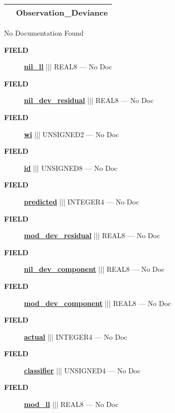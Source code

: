 {\renewcommand{\arraystretch}{1.5}
\begin{tabularx}{\textwidth}{|>{\raggedright\arraybackslash}l|X|}
\hline
\hspace{0pt}\mytexttt{\color{red} } & \textbf{Observation\_Deviance} \\
\hline
\end{tabularx}
}

\par





No Documentation Found







\par
\begin{description}
\item [\colorbox{tagtype}{\color{white} \textbf{\textsf{FIELD}}}] \textbf{\underline{nil\_ll}} ||| REAL8 --- No Doc
\item [\colorbox{tagtype}{\color{white} \textbf{\textsf{FIELD}}}] \textbf{\underline{nil\_dev\_residual}} ||| REAL8 --- No Doc
\item [\colorbox{tagtype}{\color{white} \textbf{\textsf{FIELD}}}] \textbf{\underline{wi}} ||| UNSIGNED2 --- No Doc
\item [\colorbox{tagtype}{\color{white} \textbf{\textsf{FIELD}}}] \textbf{\underline{id}} ||| UNSIGNED8 --- No Doc
\item [\colorbox{tagtype}{\color{white} \textbf{\textsf{FIELD}}}] \textbf{\underline{predicted}} ||| INTEGER4 --- No Doc
\item [\colorbox{tagtype}{\color{white} \textbf{\textsf{FIELD}}}] \textbf{\underline{mod\_dev\_residual}} ||| REAL8 --- No Doc
\item [\colorbox{tagtype}{\color{white} \textbf{\textsf{FIELD}}}] \textbf{\underline{nil\_dev\_component}} ||| REAL8 --- No Doc
\item [\colorbox{tagtype}{\color{white} \textbf{\textsf{FIELD}}}] \textbf{\underline{mod\_dev\_component}} ||| REAL8 --- No Doc
\item [\colorbox{tagtype}{\color{white} \textbf{\textsf{FIELD}}}] \textbf{\underline{actual}} ||| INTEGER4 --- No Doc
\item [\colorbox{tagtype}{\color{white} \textbf{\textsf{FIELD}}}] \textbf{\underline{classifier}} ||| UNSIGNED4 --- No Doc
\item [\colorbox{tagtype}{\color{white} \textbf{\textsf{FIELD}}}] \textbf{\underline{mod\_ll}} ||| REAL8 --- No Doc
\end{description}





